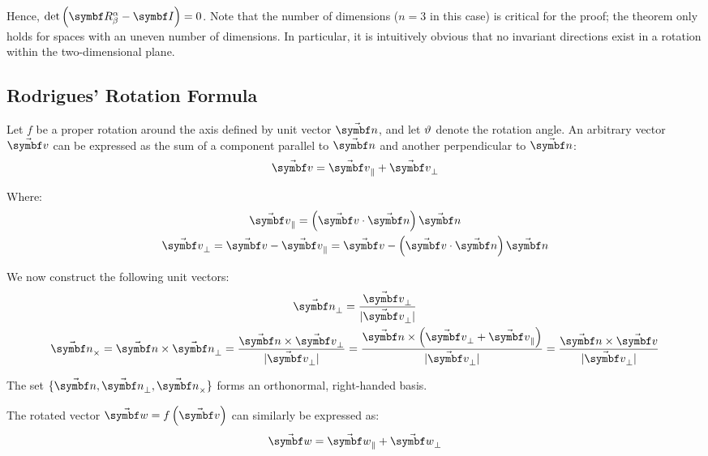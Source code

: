 Hence, $\det \rndp{\RotM{\alpha}{\beta}-\IdM}=0$. Note that the number of dimensions ($n=3$ in this case) is critical for the proof; the theorem only holds for spaces with an uneven number of dimensions. In particular, it is intuitively obvious that no invariant directions exist in a rotation within the two\nobreakdash-dimensional plane.

\subsection{Rodrigues' Rotation Formula}
Let $f$ be a proper rotation around the axis defined by unit vector $\vabs{\rotax}$, and let $\vartheta$ denote the rotation angle. An arbitrary vector $\vabs{v}$ can be expressed as the sum of a component parallel to $\vabs{\rotax}$ and another perpendicular to $\vabs{\rotax}$:
\begin{equation*}
	\vabs{v} = \vasub{v}{\parallel} + \vasub{v}{\perp}
\end{equation*}

Where:
\begin{gather}
\vasub{v}{\parallel} = \rndp{\vabs{v} \cdot \vabs{\rotax}}\vabs{\rotax} \label{Eq.Deriv.RotM.XPar} \\
\vasub{v}{\perp} = \vabs{v} - \vasub{v}{\parallel} = \vabs{v} - \rndp{\vabs{v}\cdot \vabs{\rotax}} \vabs{\rotax} \label{Eq.Deriv.RotM.XPerp}
\end{gather}

We now construct the following unit vectors:
\begin{gather}
\vasub{\rotax}{\perp} = \frac{\vasub{v}{\perp}}{|\vasub{v}{\perp}|} \label{Eq.Def.RotMat.UPerp}\\
\vasub{\rotax}{\times} = \vabs{\rotax} \times \vasub{\rotax}{\perp} = \frac{\vabs{\rotax} \times \vasub{v}{\perp}}{|\vasub{v}{\perp}|} = \frac{\vabs{\rotax} \times \rndp{\vasub{v}{\perp}+\vasub{v}{\parallel}}}{|\vasub{v}{\perp}|}= \frac{\vabs{\rotax} \times \vabs{v}}{|\vasub{v}{\perp}|} \label{Eq.Def.RotMat.UTimes}
\end{gather}

The set $\{\vabs{\rotax}, \vasub{\rotax}{\perp}, \vasub{\rotax}{\times}\}$ forms an orthonormal, right-handed basis.

The rotated vector $\vabs{w}=f\rndp{\vabs{v}}$ can similarly be expressed as:
\begin{equation}\label{Eq.Deriv.RotM.Y}
\vabs{w} = \vasub{w}{\parallel} + \vasub{w}{\perp}
\end{equation}

